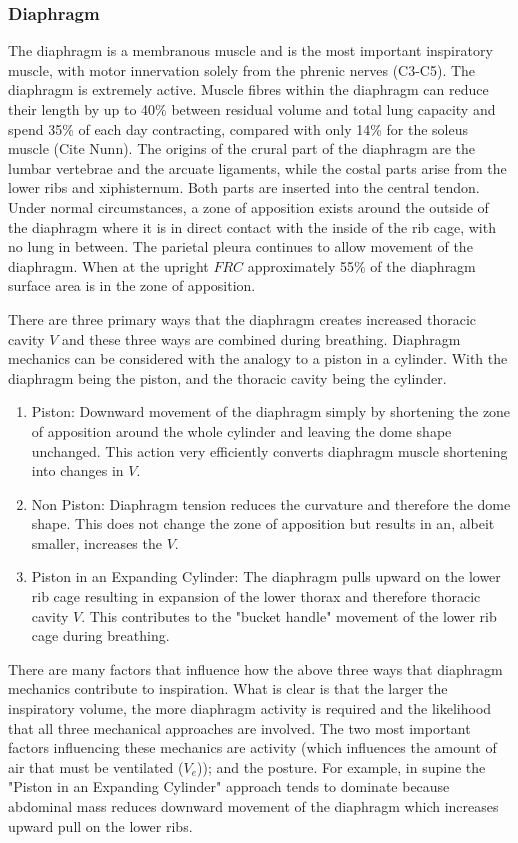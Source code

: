 \subsubsection{Diaphragm}

The diaphragm is a membranous muscle and is the most important inspiratory muscle, with motor innervation solely from the phrenic nerves (C3-C5). The diaphragm is extremely active. Muscle fibres within the diaphragm can reduce their length by up to 40\% between residual volume and total lung capacity and spend 35\% of each day contracting, compared with only 14\% for the soleus muscle (Cite Nunn). The origins of the crural part of the diaphragm are the lumbar vertebrae and the arcuate ligaments, while the costal parts arise from the lower ribs and xiphisternum. Both parts are inserted into the central tendon. 
Under normal circumstances, a zone of apposition exists around the outside of the diaphragm where it is in direct contact with the inside of the rib cage, with no lung in between. The parietal pleura continues to allow movement of the diaphragm. When at the upright $FRC$ approximately 55\% of the diaphragm surface area is in the zone of apposition.

There are three primary ways that the diaphragm creates increased thoracic cavity $V$ and these three ways are combined during breathing. Diaphragm mechanics can be considered with the analogy to a piston in a cylinder. With the diaphragm being the piston, and the thoracic cavity being the cylinder. 

\begin{enumerate}
    \item Piston: Downward movement of the diaphragm simply by shortening the zone of apposition around the whole cylinder and leaving the dome shape unchanged. This action very efficiently converts diaphragm muscle shortening into changes in $V$.
    \item Non Piston: Diaphragm tension reduces the curvature and therefore the dome shape. This does not change the zone of apposition but results in an, albeit smaller, increases the $V$.
    \item Piston in an Expanding Cylinder: The diaphragm pulls upward on the lower rib cage resulting in expansion of the lower thorax and therefore thoracic cavity $V$. This contributes to the "bucket handle" movement of the lower rib cage during breathing.
\end{enumerate}

There are many factors that influence how the above three ways that diaphragm mechanics contribute to inspiration. What is clear is that the larger the inspiratory volume, the more diaphragm activity is required and the likelihood that all three mechanical approaches are involved. The two most important factors influencing these mechanics are activity (which influences the amount of air that must be ventilated ($V_e$)); and the posture. For example, in supine the "Piston in an Expanding Cylinder" approach tends to dominate because abdominal mass reduces downward movement of the diaphragm which increases upward pull on the lower ribs.


